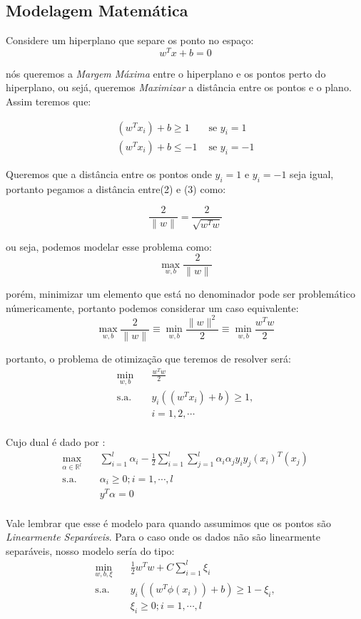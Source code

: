 \documentclass{article}
\begin{document}
\subsection{Modelagem Matemática}

 Considere um hiperplano que separe os ponto no espaço:
\[w^Tx+b=0\]

nós queremos a \textit{Margem Máxima} entre o hiperplano e os pontos perto do hiperplano, ou sejá, queremos \textit{Maximizar} a distância entre os pontos e o plano. Assim teremos que:

\begin{align}
    (w^Tx_i)+b\geq 1 &\text{ se } y_i=1 \\
    (w^Tx_i)+b\leq -1 &\text{ se } y_i=-1
\end{align}

Queremos que a distância entre os pontos onde \(y_i=1\) e \(y_i=-1\) seja igual, portanto pegamos a distância entre(2) e (3) como:

\[\frac{2}{\|w\|}= \frac{2}{\sqrt{w^Tw}}\]

ou seja, podemos modelar esse problema como:
\[\max_{w,b}\frac{2}{\|w\|}\]

porém, minimizar um elemento que está no denominador pode ser problemático númericamente, portanto podemos considerar um caso equivalente:
\[\max_{w,b}\frac{2}{\|w\|}\equiv \min_{w,b}\frac{\|w\|^2}{2}\equiv\min_{w,b}\frac{w^Tw}{2}\]

portanto, o problema de otimização que teremos de resolver será:
\[
\begin{aligned}
\min_{w,b} \quad & \frac{w^Tw}{2}\\
\textrm{s.a.} \quad & y_i((w^Tx_i)+b)\geq1,\\
  &i=1,2,\cdots    \\
\end{aligned}
\]

Cujo dual é dado por \cite{Evelin}:
\[
\begin{aligned}
\max_{\alpha\in \mathbb{R}^l} \quad &\sum_{i=1}^{l}\alpha_i-\frac{1}{2}\sum_{i=1}^{l}\sum_{j=1}^{l}\alpha_i\alpha_j y_i y_j(x_i)^T(x_j)\\
\textrm{s.a.} \quad & \alpha_i\geq0;i=1,\cdots,l\\
  &y^T\alpha=0   \\
\end{aligned}\]

Vale lembrar que esse é modelo para quando assumimos que os pontos são \textit{Linearmente Separáveis}. Para o caso onde os dados não são linearmente separáveis, nosso modelo sería do tipo:
\[
\begin{aligned}
\min_{w,b,\xi} \quad &\frac{1}{2}w^Tw+C\sum_{i=1}^{l}\xi_i\\
\textrm{s.a.} \quad & y_i((w^T\phi(x_i))+b)\geq1-\xi_i,\\
  &\xi_i\geq0;i=1,\cdots,l   \\
\end{aligned}
\]
\end{document}
